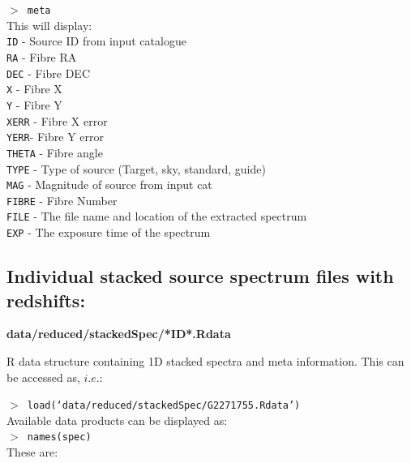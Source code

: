 \documentclass[12pt]{article}
\begin{document}
\hspace{10mm}  \texttt{$>$ meta}\\

This will display:\\

\texttt{ID} - Source ID from input catalogue    \\
\texttt{RA} - Fibre RA \\
\texttt{DEC} - Fibre DEC \\
\texttt{X} - Fibre X \\
\texttt{Y} - Fibre Y \\
\texttt{XERR} - Fibre X error \\
\texttt{YERR}- Fibre Y error\\
\texttt{THETA} - Fibre angle \\
\texttt{TYPE} - Type of source (Target, sky, standard, guide)\\
\texttt{MAG} - Magnitude of source from input cat\\
\texttt{FIBRE} - Fibre Number\\
\texttt{FILE} - The file name and location of the extracted spectrum \\
\texttt{EXP} - The exposure time of the spectrum \\

 \subsection{Individual stacked source spectrum files with redshifts:}
 
  \textbf{data/reduced/stackedSpec/*ID*.Rdata} 
  
  R data structure containing 1D stacked spectra and meta information. This can be accessed as, $i.e.$:
  
  \hspace{10mm}  \texttt{$>$ load(`data/reduced/stackedSpec/G2271755.Rdata')}\\

Available data products can be displayed as:\\

\hspace{10mm}  \texttt{$>$ names(spec)}\\  

These are: \\
\end{document}
